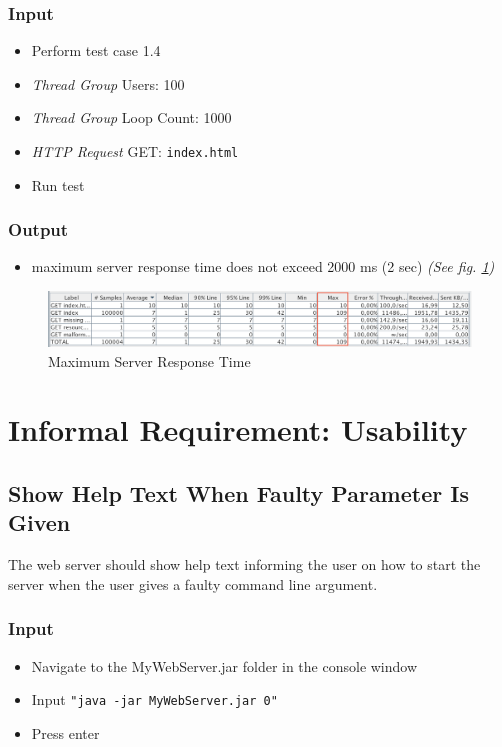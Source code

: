\documentclass[a4paper, 12pt]{article}
\begin{document}
\subsubsection{Input}
\begin{itemize}
\item Perform test case 1.4
\item \textit{Thread Group} Users: 100
\item \textit{Thread Group} Loop Count: 1000
\item \textit{HTTP Request} GET: \texttt{index.html}
\item Run test
\end{itemize}

\subsubsection{Output}
\begin{itemize}
\item maximum server response time does not exceed 2000 ms (2 sec) \textit{(See fig. \ref{TC4.1})}
\end{itemize}

\begin{figure}[H]
\includegraphics[scale=0.5]{output_clarification/HighLoad.png} 
\caption{Maximum Server Response Time}
\label{TC4.1}
\end{figure}

\section{Informal Requirement: Usability}

\subsection{Show Help Text When Faulty Parameter Is Given}

The web server should show help text informing the user on how to start the server when the user gives a faulty command line argument. 

\subsubsection{Input}
\begin{itemize}
\item Navigate to the MyWebServer.jar folder in the console window
\item Input \texttt{"java -jar MyWebServer.jar 0"}
\item Press enter
\end{itemize} 
\end{document}
